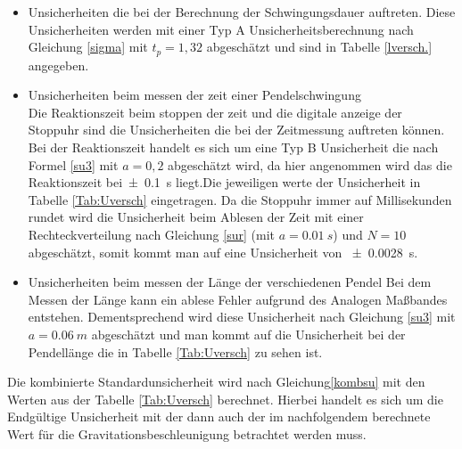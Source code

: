 \begin{itemize}
	\item Unsicherheiten die bei der Berechnung der Schwingungsdauer auftreten.
	Diese Unsicherheiten werden mit einer Typ A Unsicherheitsberechnung nach Gleichung \ref{sigma} mit $t_p = 1,32$ abgeschätzt und sind in Tabelle \ref{lversch.} angegeben.
	\item Unsicherheiten beim messen der zeit einer Pendelschwingung\\
	Die Reaktionszeit beim stoppen der zeit und die digitale anzeige der Stoppuhr sind die Unsicherheiten die bei der Zeitmessung auftreten können. Bei der Reaktionszeit handelt es sich um eine Typ B Unsicherheit die nach Formel \ref{su3} mit $a=0,2$ abgeschätzt wird, da hier angenommen wird das die Reaktionszeit bei\SI{+- 0,1}{s} liegt.Die jeweiligen werte der Unsicherheit in Tabelle \ref{Tab:Uversch} eingetragen. Da die Stoppuhr immer auf Millisekunden rundet wird die Unsicherheit beim Ablesen der Zeit  mit einer Rechteckverteilung nach Gleichung \ref{sur} (mit $a=\SI{0,01}{s}$) und $N=10$abgeschätzt,  somit kommt man auf eine Unsicherheit von \SI{+-0,0028}{s}.
	\item Unsicherheiten beim messen der Länge der verschiedenen Pendel
	Bei dem Messen der Länge kann ein ablese Fehler aufgrund des Analogen Maßbandes entstehen. Dementsprechend wird diese Unsicherheit nach Gleichung \ref{su3} mit $a= \SI{0,06}{m}$ abgeschätzt und man kommt auf die Unsicherheit bei der Pendellänge die in Tabelle \ref{Tab:Uversch} zu sehen ist. 
\end{itemize}
 Die kombinierte Standardunsicherheit wird nach Gleichung\ref{kombsu} mit den Werten  aus der Tabelle \ref{Tab:Uversch} berechnet.
 Hierbei handelt es sich um die Endgültige Unsicherheit mit der dann auch der im nachfolgendem berechnete Wert für die Gravitationsbeschleunigung betrachtet werden muss. 
 
